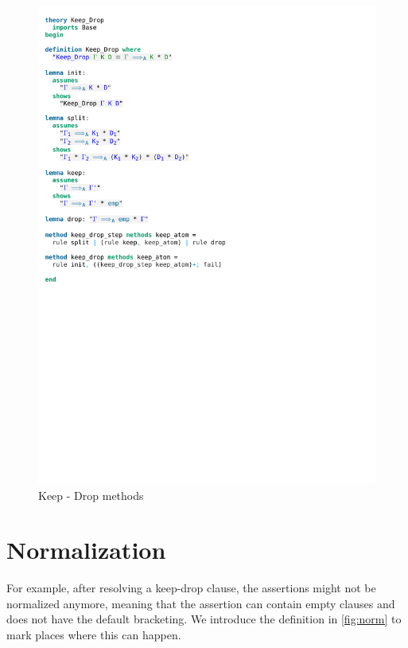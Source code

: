 \begin{figure}[htpb]
    \includegraphics[trim={0 13,4cm 0 14cm}, clip, width=1.00\textwidth]{figures/Theory_Keep_Drop.pdf}
    \caption[Keep-Drop methods]{Keep - Drop methods}
    \label{fig:keep_drop_methods}
\end{figure}

\section{Normalization}

For example, after resolving a keep-drop clause, the assertions might not be normalized anymore, meaning that the assertion can contain empty clauses and does not have the default bracketing. We introduce the definition in \autoref{fig:norm} to mark places where this can happen.

